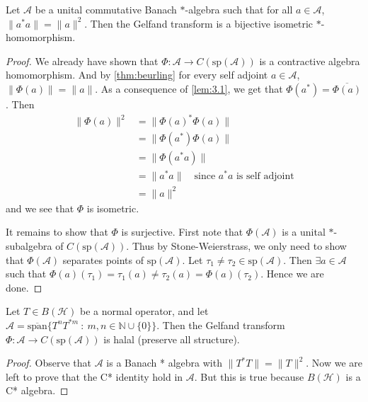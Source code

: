 \begin{theorem}
  Let $\mathcal{A}$ be a unital commutative Banach $*$-algebra such
  that for all $a \in \mathcal{A}$, $\|a^*a\| = \|a\|^2$. Then the
  Gelfand transform is a bijective isometric $*$-homomorphism.
\end{theorem}
\begin{proof}
  We already have shown that $\Phi: \mathcal{A} \to
  C(\textrm{sp}(\mathcal{A}))$ is a contractive algebra homomorphism.
  And by \autoref{thm:beurling} for every self adjoint $a \in
  \mathcal{A}$, $\|\Phi(a)\| = \|a\|$. As a consequence of
  \autoref{lem:3.1}, we get that $\Phi(a^*) = \overline{\Phi(a)}$. Then
  \begin{align*}
    \|\Phi(a)\|^2 &= \|\Phi(a)^* \Phi(a)\| \\
    &= \|\Phi(a^*) \Phi(a)\| \\
    &= \|\Phi(a^* a)\| \\
    &= \|a^*a\| \quad \textrm{since $a^*a$ is self adjoint} \\
    &= \|a\|^2
  \end{align*}
  and we see that $\Phi$ is isometric.

  It remains to show that $\Phi$ is surjective. First note that
  $\Phi(\mathcal{A})$ is a unital $*$-subalgebra of
  $C(\textrm{sp}(\mathcal{A}))$. Thus by Stone-Weierstrass, we only
  need to show that $\Phi(\mathcal{A})$ separates points of
  $\textrm{sp}(\mathcal{A})$. Let $\tau_1 \neq \tau_2 \in
  \textrm{sp}(\mathcal{A})$. Then $\exists a \in \mathcal{A}$ such
  that $\Phi(a)(\tau_1) = \tau_1(a) \neq \tau_2(a) =
  \Phi(a)(\tau_2)$. Hence we are done.
\end{proof}

\begin{corollary}
  \label{cor:algebra_spanned_by_normal_operator_isomorphic_to_continuous_functions_in_spectrum}
  Let $T \in B(\mathcal{H})$ be a normal operator, and let
  $\mathcal{A} = \overline{\textrm{span}} \{ T^n T^{*m}  \ : \ m, n
  \in \mathbb{N} \cup \{ 0 \}  \}$. Then the Gelfand transform $\Phi:
  \mathcal{A} \to C(\textrm{sp}(\mathcal{A}))$ is halal (preserve all
  structure).
\end{corollary}
\begin{proof}
  Observe that $\mathcal{A}$ is a Banach * algebra with $\|T^*T\| =
  \|T\|^2$. Now we are left to prove that the C* identity hold in
  $\mathcal{A}$. But this is true because $B(\mathcal{H})$ is a C* algebra.
\end{proof}

